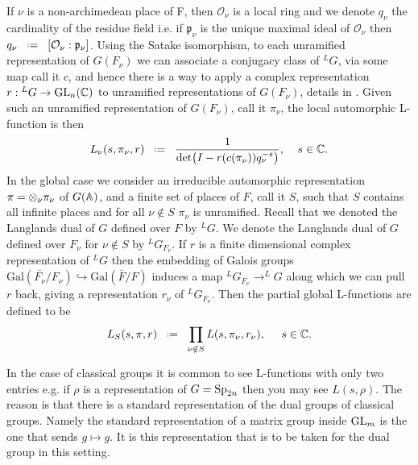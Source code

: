 If \(\nu\) is a non-archimedean place of F, then \(\mathcal{O}_\nu\) is a local ring and we denote \(q_\nu\) the cardinality of the residue field i.e. if \(\mathfrak{p}_\nu\) is the unique maximal ideal of \(\mathcal{O}_\nu\) then \(q_\nu \defeq [\mathcal{O}_\nu: \mathfrak{p}_\nu]\). Using the Satake isomorphism, to each unramified representation of \(G(F_\nu)\) we can associate a conjugacy class of \(^LG\), via some map call it \(c\), and hence there is a way to apply a complex representation \(r: \phantom{ }^LG \to \GL_n(\C)\) to unramified representations of \(G(F_\nu)\), details in \cite[2]{shahidiEisensteinSeriesAutomorphic2010}. 
Given such an unramified representation of \(G(F_\nu)\), call it \(\pi_\nu\), the local automorphic L-function is then 
\[ L_\nu(s,\pi_\nu , r ) \defeq  \frac{1}{\det\bigl( I - r(c(\pi_\nu))q_\nu^{-s} \bigr)} ,\;\;\;\; s\in \C.\]
In the global case we consider an irreducible automorphic representation \(\pi = \otimes_\nu \pi_\nu\) of \(G(\A)\), and a finite set of places of \(F\), call it \(S\), such that \(S\) contains all infinite places and for all \(\nu\notin S\) \(\pi_\nu\) is unramified. Recall that we denoted the Langlands dual of \(G\) defined over \(F\) by \(^LG\). We denote the Langlands dual of \(G\) defined over \(F_\nu\) for \(\nu\notin S\) by \(^LG_{F_\nu}\).  If \(r\) is a finite dimensional complex representation of \(^LG\) then the embedding of Galois groups \(\mathrm{Gal}(\bar{F_\nu} / F_\nu) \hookrightarrow \mathrm{Gal}(\bar{F} / F) \) induces a map \(^LG_{F_\nu} \to ^LG\) along which we can pull \(r\) back, giving a representation \(r_\nu\) of \(^LG_{F_\nu}\). Then the partial global L-functions are defined to be 
\[L_S(s, \pi, r) \defeq \prod_{\nu\notin S} L(s, \pi_\nu, r_\nu), \;\;\;\;\; s\in \C.\]


\begin{example}
	In the case of classical groups it is common to see L-functions with only two entries e.g. if \(\rho\) is a representation of \(G = \operatorname{Sp}_{2n}\) then you may see 
	\(L(s, \rho).\)
	The reason is that there is a standard representation of the dual groups of classical groups. Namely the standard representation of a matrix group inside \(\operatorname{GL}_m\) is the one that sends \(g\mapsto g\). It is this representation that is to be taken for the dual group in this setting.
\end{example}

